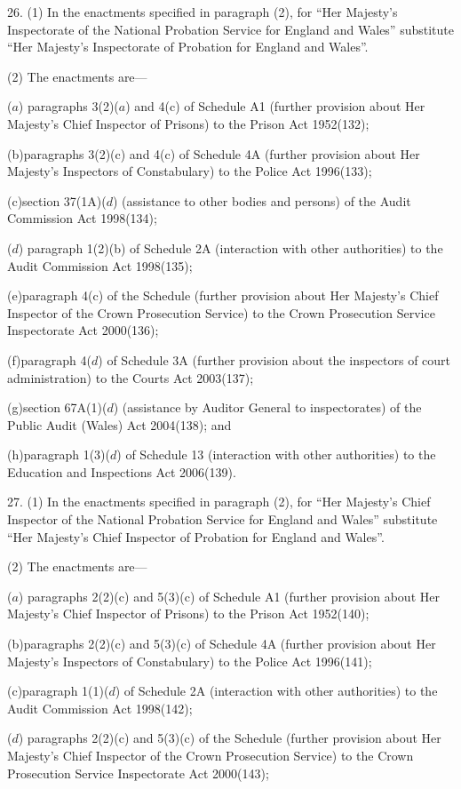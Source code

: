\documentclass[12pt,a4paper]{article}
\begin{document}
26.  (1)  In the enactments specified in paragraph (2), for “Her Majesty’s Inspectorate of the National Probation Service for England and Wales” substitute “Her Majesty’s Inspectorate of Probation for England and Wales”.

(2) The enactments are—

($a$) paragraphs 3(2)($a$)  and 4(c) of Schedule A1 (further provision about Her Majesty’s Chief Inspector of Prisons) to the Prison Act 1952(132);

(b)paragraphs 3(2)(c) and 4(c) of Schedule 4A (further provision about Her Majesty’s Inspectors of Constabulary) to the Police Act 1996(133);

(c)section 37(1A)($d$)  (assistance to other bodies and persons) of the Audit Commission Act 1998(134);

($d$) paragraph 1(2)(b) of Schedule 2A (interaction with other authorities) to the Audit Commission Act 1998(135);

(e)paragraph 4(c) of the Schedule (further provision about Her Majesty’s Chief Inspector of the Crown Prosecution Service) to the Crown Prosecution Service Inspectorate Act 2000(136);

(f)paragraph 4($d$)  of Schedule 3A (further provision about the inspectors of court administration) to the Courts Act 2003(137);

(g)section 67A(1)($d$)  (assistance by Auditor General to inspectorates) of the Public Audit (Wales) Act 2004(138); and

(h)paragraph 1(3)($d$)  of Schedule 13 (interaction with other authorities) to the Education and Inspections Act 2006(139).

27.  (1)  In the enactments specified in paragraph (2), for “Her Majesty’s Chief Inspector of the National Probation Service for England and Wales” substitute “Her Majesty’s Chief Inspector of Probation for England and Wales”.

(2) The enactments are—

($a$) paragraphs 2(2)(c) and 5(3)(c) of Schedule A1 (further provision about Her Majesty’s Chief Inspector of Prisons) to the Prison Act 1952(140);

(b)paragraphs 2(2)(c) and 5(3)(c) of Schedule 4A (further provision about Her Majesty’s Inspectors of Constabulary) to the Police Act 1996(141);

(c)paragraph 1(1)($d$)  of Schedule 2A (interaction with other authorities) to the Audit Commission Act 1998(142);

($d$) paragraphs 2(2)(c) and 5(3)(c) of the Schedule (further provision about Her Majesty’s Chief Inspector of the Crown Prosecution Service) to the Crown Prosecution Service Inspectorate Act 2000(143);
\end{document}
